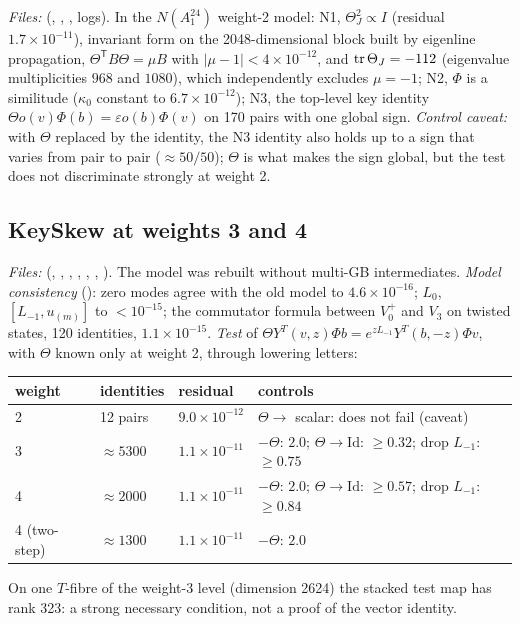 \emph{Files:}  (, , , logs). In the
$N(A_1^{24})$ weight-2 model: N1, $\Theta_J^2\propto I$ (residual $1.7\times10^{-11}$), invariant form
on the 2048-dimensional block built by eigenline propagation, $\Theta^{\mathsf T}B\Theta=\mu B$ with
$|\mu-1|<4\times10^{-12}$, and $\operatorname{tr}\Theta_J=-112$ (eigenvalue multiplicities $968$ and $1080$), which
independently excludes $\mu=-1$; N2, $\Phi$ is a similitude ($\kappa_0$ constant to
$6.7\times10^{-12}$); N3, the top-level key identity $\Theta o(v)\Phi(b)=\varepsilon o(b)\Phi(v)$ on 170
pairs with one global sign. \emph{Control caveat:} with $\Theta$ replaced by the identity, the N3
identity also holds up to a sign that varies from pair to pair ($\approx50/50$); $\Theta$ is what makes
the sign global, but the test does not discriminate strongly at weight 2.

\subsection{KeySkew at weights 3 and 4}

\emph{Files:}  (, , , ,
, , ). The model was rebuilt without multi-GB
intermediates. \emph{Model consistency} (): zero modes agree with the old model to
$4.6\times10^{-16}$; $L_0$, $[L_{-1},u_{(m)}]$ to $<10^{-15}$; the commutator formula between $V_0^+$ and
$V_3$ on twisted states, 120 identities, $1.1\times10^{-15}$. \emph{Test} of
$\Theta Y^T(v,z)\Phi b=e^{zL_{-1}}Y^T(b,-z)\Phi v$, with $\Theta$ known only at weight 2, through
lowering letters:

\begin{center}
\begin{tabular}{llll}
\toprule
weight & identities & residual & controls \\
\midrule
2 & 12 pairs & $9.0\times10^{-12}$ & $\Theta\to$ scalar: does not fail (caveat) \\
3 & $\approx5300$ & $1.1\times10^{-11}$ & $-\Theta$: $2.0$; $\Theta\to\mathrm{Id}$: $\ge0.32$; drop $L_{-1}$: $\ge0.75$\\
4 & $\approx2000$ & $1.1\times10^{-11}$ & $-\Theta$: $2.0$; $\Theta\to\mathrm{Id}$: $\ge0.57$; drop $L_{-1}$: $\ge0.84$\\
4 (two-step) & $\approx1300$ & $1.1\times10^{-11}$ & $-\Theta$: $2.0$\\
\bottomrule
\end{tabular}
\end{center}
On one $T$-fibre of the weight-3 level (dimension 2624) the stacked test map has rank 323: a strong
necessary condition, not a proof of the vector identity.


